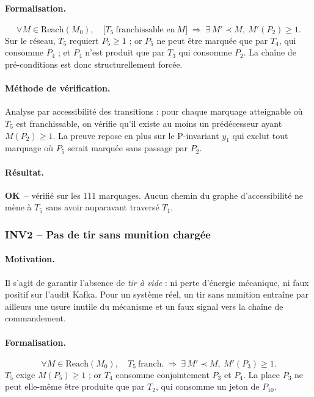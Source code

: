 \documentclass[11pt,a4paper]{article}
\newcommand{\OK}{\textcolor{green!50!black}{\textbf{OK}}}
\begin{document}
\paragraph{Formalisation.}
\[
\forall M \in \mathrm{Reach}(M_0),\quad
\bigl[T_5\ \text{franchissable en}\ M\bigr] \;\Longrightarrow\; \exists\, M' \prec M,\ M'(P_2) \geq 1.
\]
Sur le réseau, $T_5$ requiert $P_5 \geq 1$ ; or $P_5$ ne peut être marquée
que par $T_4$, qui consomme $P_4$ ; et $P_4$ n'est produit que par $T_3$
qui consomme $P_2$. La chaîne de pré-conditions est donc structurellement
forcée.

\paragraph{Méthode de vérification.}
Analyse par accessibilité des transitions : pour chaque marquage atteignable
où $T_5$ est franchissable, on vérifie qu'il existe au moins un prédécesseur
ayant $M(P_2) \geq 1$. La preuve repose en plus sur le P-invariant $y_1$
qui exclut tout marquage où $P_5$ serait marquée sans passage par $P_2$.

\paragraph{Résultat.}
\OK\ -- vérifié sur les 111 marquages. Aucun chemin du graphe d'accessibilité
ne mène à $T_5$ sans avoir auparavant traversé $T_1$.

\subsubsection*{INV2 -- Pas de tir sans munition chargée}

\paragraph{Motivation.}
Il s'agit de garantir l'absence de \emph{tir à vide} : ni perte d'énergie
mécanique, ni faux positif sur l'audit Kafka. Pour un système réel, un tir
sans munition entraîne par ailleurs une usure inutile du mécanisme et un
faux signal vers la chaîne de commandement.

\paragraph{Formalisation.}
\[
\forall M \in \mathrm{Reach}(M_0),\quad T_5\ \text{franch.}\ \Longrightarrow\ \exists\, M' \prec M,\ M'(P_3) \geq 1.
\]
$T_5$ exige $M(P_5) \geq 1$ ; or $T_4$ consomme conjointement $P_3$ et
$P_4$. La place $P_3$ ne peut elle-même être produite que par $T_2$, qui
consomme un jeton de $P_{10}$.
\end{document}
